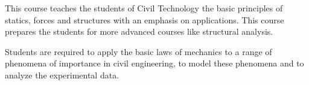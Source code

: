 {This course teaches the students of Civil Technology the basic principles of statics, forces and structures with an emphasis on applications.  This course prepares the students for more advanced courses like structural analysis.  

Students are required to apply the basic laws of mechanics to a range of phenomena of importance in civil engineering, to model these phenomena and to analyze the experimental data.}

